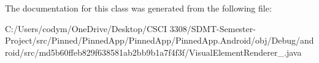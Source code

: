 The documentation for this class was generated from the following file\+:\begin{DoxyCompactItemize}
\item 
C\+:/\+Users/codym/\+One\+Drive/\+Desktop/\+C\+S\+C\+I 3308/\+S\+D\+M\+T-\/\+Semester-\/\+Project/src/\+Pinned/\+Pinned\+App/\+Pinned\+App/\+Pinned\+App.\+Android/obj/\+Debug/android/src/md5b60ffeb829f638581ab2bb9b1a7f4f3f/Visual\+Element\+Renderer\+\_.\+java\end{DoxyCompactItemize}
